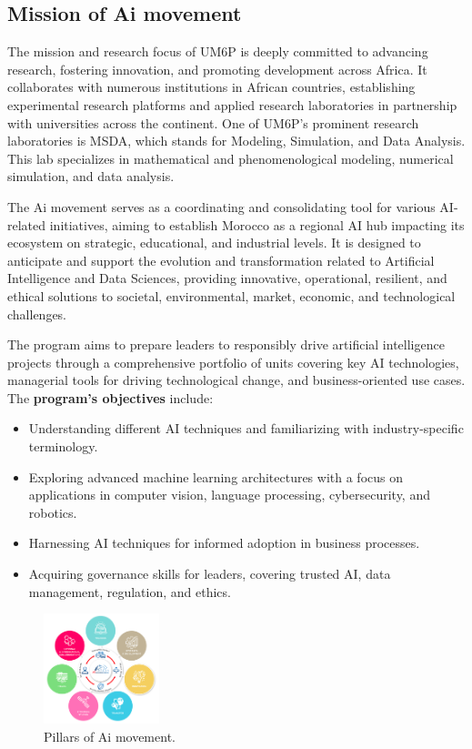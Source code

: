 \FloatBarrier

\subsection{Mission of Ai movement}

The mission and research focus of UM6P is deeply committed to advancing research, fostering innovation, and promoting development across Africa. It collaborates with numerous institutions in African countries, establishing experimental research platforms and applied research laboratories in partnership with universities across the continent. One of UM6P's prominent research laboratories is MSDA, which stands for Modeling, Simulation, and Data Analysis. This lab specializes in mathematical and phenomenological modeling, numerical simulation, and data analysis.

The Ai movement serves as a coordinating and consolidating tool for various AI-related initiatives, aiming to establish Morocco as a regional AI hub impacting its ecosystem on strategic, educational, and industrial levels. It is designed to anticipate and support the evolution and transformation related to Artificial Intelligence and Data Sciences, providing innovative, operational, resilient, and ethical solutions to societal, environmental, market, economic, and technological challenges.

The program aims to prepare leaders to responsibly drive artificial intelligence projects through a comprehensive portfolio of units covering key AI technologies, managerial tools for driving technological change, and business-oriented use cases. The \textbf{program's objectives} include:
\begin{itemize}
    \item Understanding different AI techniques and familiarizing with industry-specific terminology.
    \item Exploring advanced machine learning architectures with a focus on applications in computer vision, language processing, cybersecurity, and robotics.
    \item Harnessing AI techniques for informed adoption in business processes.
    \item Acquiring governance skills for leaders, covering trusted AI, data management, regulation, and ethics.
\end{itemize}
\begin{figure}[H]
  \centering
  \includegraphics[width=0.3\textwidth]{images_pfe/Screenshot from 2024-06-08 18-57-32.png}
  \caption{Pillars of Ai movement.}
\end{figure}
\FloatBarrier


